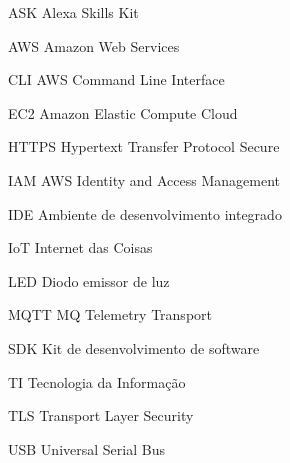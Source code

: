 \documentclass[
	12pt,
	openright,
	twoside,
	a4paper,
	brazil,
]{abntex2}
\begin{document}
\begin{siglas}
    \item[ASK] Alexa Skills Kit
    \item[AWS] Amazon Web Services
    \item[CLI] AWS Command Line Interface
    \item[EC2] Amazon Elastic Compute Cloud
    \item[HTTPS] Hypertext Transfer Protocol Secure
    \item[IAM] AWS Identity and Access Management
    \item[IDE] Ambiente de desenvolvimento integrado
    \item[IoT] Internet das Coisas
    \item[LED] Diodo emissor de luz
    \item[MQTT] MQ Telemetry Transport
    \item[SDK] Kit de desenvolvimento de software
    \item[TI] Tecnologia da Informação
    \item[TLS] Transport Layer Security
    \item[USB] Universal Serial Bus
\end{siglas}

\tableofcontents*
\cleardoublepage

\textual




\end{document}
